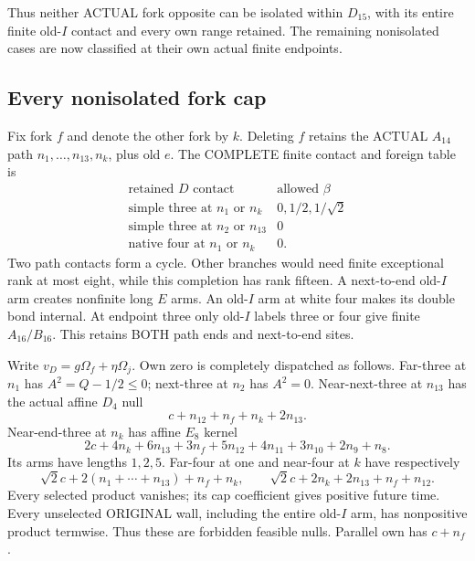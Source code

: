 \documentclass[11pt]{article}
\begin{document}
Thus neither ACTUAL fork opposite can be isolated
within \(D_{15}\), with its entire finite old-\(I\)
contact and every own range retained.
The remaining nonisolated cases are now classified
at their own actual finite endpoints.

\subsection{Every nonisolated fork cap}
\label{app:arithD15Iforknonisolated}

Fix fork \(f\) and denote the other fork by \(k\).
Deleting \(f\) retains the ACTUAL \(A_{14}\) path
\(n_1,\ldots,n_{13},n_k\), plus old \(e\).
The COMPLETE finite contact and foreign table is
\[
\begin{array}{c|c}
 \text{retained }D\text{ contact}&\text{allowed }\beta\\ \hline
 \text{simple three at }n_1\text{ or }n_k&0,1/2,1/\sqrt2\\
 \text{simple three at }n_2\text{ or }n_{13}&0\\
 \text{native four at }n_1\text{ or }n_k&0.
\end{array}
\]
Two path contacts form a cycle.
Other branches would need finite exceptional rank
at most eight, while this completion has rank fifteen.
A next-to-end old-\(I\) arm creates nonfinite long
\(E\) arms.
An old-\(I\) arm at white four makes its double
bond internal.
At endpoint three only old-\(I\) labels three
or four give finite \(A_{16}/B_{16}\).
This retains BOTH path ends and next-to-end sites.

Write \(v_D=g\Omega_f+\eta\Omega_j\).
Own zero is completely dispatched as follows.
Far-three at \(n_1\) has \(A^2=Q-1/2\le0\);
next-three at \(n_2\) has \(A^2=0\).
Near-next-three at \(n_{13}\) has the actual affine
\(D_4\) null
\[
                       c+n_{12}+n_f+n_k+2n_{13}.
\]
Near-end-three at \(n_k\) has affine \(E_8\) kernel
\[
 2c+4n_k+6n_{13}+3n_f+5n_{12}
                 +4n_{11}+3n_{10}+2n_9+n_8 .
\]
Its arms have lengths \(1,2,5\).
Far-four at one and near-four at \(k\) have respectively
\[
 \sqrt2c+2(n_1+\cdots+n_{13})+n_f+n_k,\qquad
 \sqrt2c+2n_k+2n_{13}+n_f+n_{12}.
\]
Every selected product vanishes; its cap coefficient
gives positive future time.
Every unselected ORIGINAL wall, including the entire
old-\(I\) arm, has nonpositive product termwise.
Thus these are forbidden feasible nulls.
Parallel own has \(c+n_f\).
\end{document}
